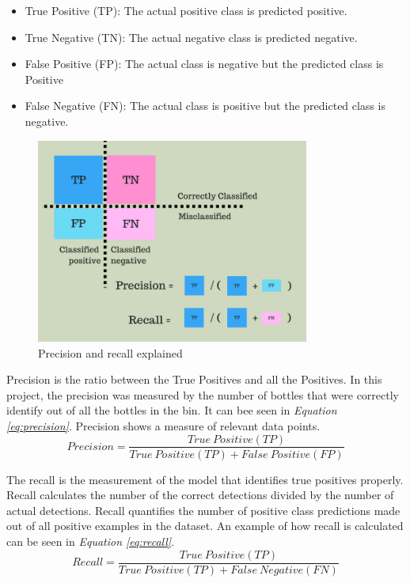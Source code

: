 \begin{itemize}
    \item True Positive (TP): The actual positive class is predicted positive.
    \item True Negative (TN): The actual negative class is predicted negative.
    \item False Positive (FP): The actual class is negative but the predicted class is Positive
    \item False Negative (FN): The actual class is positive but the predicted class is negative.
\end{itemize}

\begin{figure}[h]
    \centering
    \includegraphics[width=0.8\textwidth]{graphics/Precisionrecall.png}
    \caption{Precision and recall explained \cite{mittapally_whats_2019}}
    \label{fig:precisionrecall}
\end{figure}



Precision is the ratio between the True Positives and all the Positives. In this project, the precision was measured by the number of bottles that were correctly identify out of all the bottles in the bin. It can bee seen in \textit{Equation \ref{eq:precision}}. Precision shows a measure of relevant data points\cite{shung_accuracy_2020}.
\begin{equation}
    Precision = \frac{True\ Positive(TP)}{True\ Positive(TP)+False \ Positive(FP)}
    \label{eq:precision}
\end{equation}


The recall is the measurement of the model that identifies true positives properly. Recall calculates the number of the correct detections divided by the number of actual detections\cite{shung_accuracy_2020}. Recall quantifies the number of positive class predictions made out of all positive examples in the dataset. An example of how recall is calculated can be seen in \textit{Equation \ref{eq:recall}}.
\begin{equation}
    Recall = \frac{True\ Positive(TP)}{True\ Positive(TP)+False \ Negative(FN)}
    \label{eq:recall}
\end{equation}

